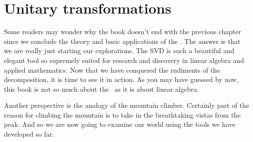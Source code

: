 \chapter{Unitary transformations}
Some readers may wonder why the book doesn't end with the previous chapter since we conclude the theory and basic applications of the \svdp. The answer is that we are really just starting our explorations. The SVD is such a beautiful and elegant tool so supremely suited for research and discovery in linear algebra and applied mathematics. Now that we have conquered the rudiments of the decomposition, it is time to see it in action. As you may have guessed  by now, this book is not so much about the \svdl \ as it is about linear algebra.

Another perspective is the analogy of the mountain climber. Certainly part of the reason for climbing the mountain is to take in the breathtaking vistas from the peak. And so we are now going to examine our world using the tools we have developed so far.





\endinput